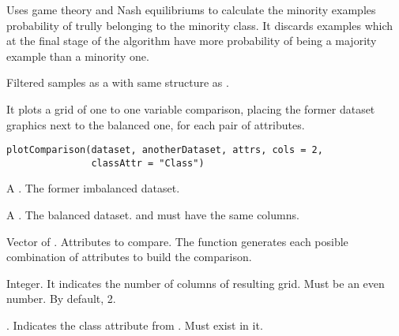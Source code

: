 %
\begin{Details}\relax
Uses game theory and Nash equilibriums to calculate the minority examples
probability of trully belonging to the minority class. It discards examples
which at the final stage of the algorithm have more probability of being a
majority example than a minority one.
\end{Details}
%
\begin{Value}
Filtered samples as a  with same structure as
.
\end{Value}
%
%
\begin{Examples}
\end{Examples}
%
\begin{Description}\relax
It plots a grid of one to one variable comparison, placing the former dataset
graphics next to the balanced one, for each pair of attributes.
\end{Description}
%
\begin{Usage}
\begin{verbatim}
plotComparison(dataset, anotherDataset, attrs, cols = 2,
               classAttr = "Class")
\end{verbatim}
\end{Usage}
%
\begin{Arguments}
\begin{ldescription}
\item[\code{dataset}] A . The former imbalanced dataset.

\item[\code{anotherDataset}] A . The balanced dataset.
 and  must have the same columns.

\item[\code{attrs}] Vector of . Attributes to compare. The function
generates each posible combination of attributes to build the comparison.

\item[\code{cols}] Integer. It indicates the number of columns of resulting grid.
Must be an even number. By default, 2.

\item[\code{classAttr}] . Indicates the class attribute from
. Must exist in it.
\end{ldescription}
\end{Arguments}
